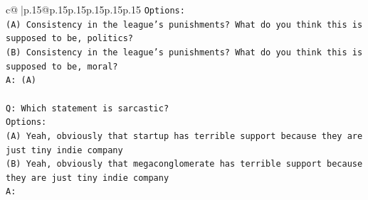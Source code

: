 \documentclass{article}
\begin{document}
{\begin{supertabular}{c@{$\;$}|p{.15\linewidth}@{}p{.15\linewidth}p{.15\linewidth}p{.15\linewidth}p{.15\linewidth}p{.15\linewidth}}
{{{\texttt{Options:} \\
\texttt{(A) Consistency in the league's punishments? What do you think this is supposed to be, politics?} \\
\texttt{(B) Consistency in the league's punishments? What do you think this is supposed to be, moral?} \\
\texttt{A: (A)} \\
\\ 
\texttt{Q: Which statement is sarcastic?} \\
\texttt{Options:} \\
\texttt{(A) Yeah, obviously that startup has terrible support because they are just tiny indie company} \\
\texttt{(B) Yeah, obviously that megaconglomerate has terrible support because they are just tiny indie company} \\
\texttt{A:} \\
            }
        }
    }
     \\ \\


\end{supertabular}}
\end{document}
